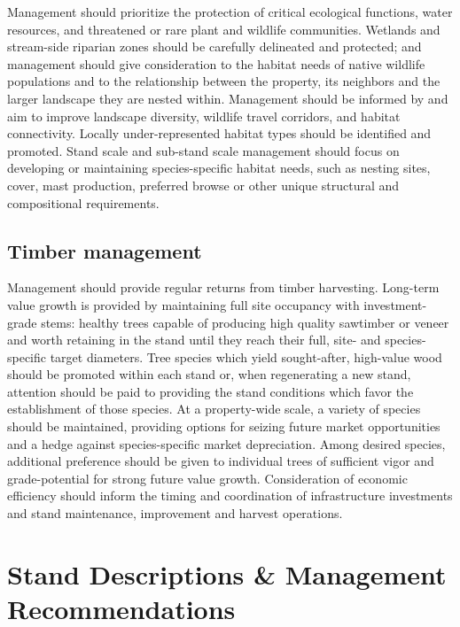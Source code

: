 \documentclass[]{tufte-handout}
\begin{document}
Management should prioritize the protection of critical ecological
functions, water resources, and threatened or rare plant and wildlife
communities. Wetlands and stream-side riparian zones should be carefully
delineated and protected; and management should give consideration to
the habitat needs of native wildlife populations and to the relationship
between the property, its neighbors and the larger landscape they are
nested within. Management should be informed by and aim to improve
landscape diversity, wildlife travel corridors, and habitat
connectivity. Locally under-represented habitat types should be
identified and promoted. Stand scale and sub-stand scale management
should focus on developing or maintaining species-specific habitat
needs, such as nesting sites, cover, mast production, preferred browse
or other unique structural and compositional requirements.

\subsection{Timber management}\label{timber-management}

Management should provide regular returns from timber harvesting.
Long-term value growth is provided by maintaining full site occupancy
with investment-grade stems: healthy trees capable of producing high
quality sawtimber or veneer and worth retaining in the stand until they
reach their full, site- and species-specific target diameters. Tree
species which yield sought-after, high-value wood should be promoted
within each stand or, when regenerating a new stand, attention should be
paid to providing the stand conditions which favor the establishment of
those species. At a property-wide scale, a variety of species should be
maintained, providing options for seizing future market opportunities
and a hedge against species-specific market depreciation. Among desired
species, additional preference should be given to individual trees of
sufficient vigor and grade-potential for strong future value growth.
Consideration of economic efficiency should inform the timing and
coordination of infrastructure investments and stand maintenance,
improvement and harvest operations.

\section{Stand Descriptions \& Management
Recommendations}\label{stand-descriptions-management-recommendations}
\end{document}
